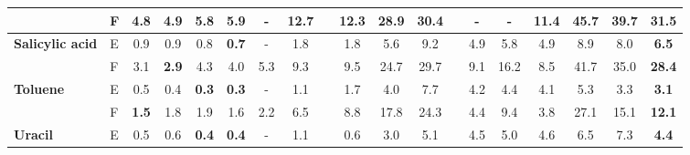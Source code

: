 \documentclass{article}
\begin{document}
\begin{table}
{\begin{tabular}{@{}llcccccccccccc | cc || ccc @{}}
       & F & \textbf{4.8}                                & 4.9                        & 5.8                                       & 5.9              & -   & 12.7                  &  & 12.3                      & 28.9                     & 30.4                     &  & -                            & -                      & 11.4                         & 45.7              & 39.7                 & \textbf{31.5} \\
      \midrule
      \multirow{2}{*}{\textbf{Salicylic acid}}
       & E & 0.9                                         & 0.9                        & 0.8                                       & \textbf{0.7}     & -    & 1.8                   &  & 1.8                       & 5.6                      & 9.2                      &  & 4.9                          & 5.8                    & 4.9                            & 8.9             & 8.0                  & \textbf{6.5}  \\
       & F & 3.1                                         & \textbf{2.9}               & 4.3                                       & 4.0                & 5.3  & 9.3                   &  & 9.5                       & 24.7                     & 29.7                     &  & 9.1                          & 16.2                   & 8.5                         &    41.7            & 35.0                 & \textbf{28.4} \\
      \midrule
      \multirow{2}{*}{\textbf{Toluene}}
       & E & 0.5                                         & 0.4                        & \textbf{0.3}                              & \textbf{0.3}     & -    & 1.1                   &  & 1.7                       & 4.0                      & 7.7                      &  & 4.2                          & 4.4                    & 4.1                           & 5.3              & 3.3                  & \textbf{3.1}  \\
       & F & \textbf{1.5}                                & 1.8                        & 1.9                                       & 1.6              & 2.2    & 6.5                   &  & 8.8                       & 17.8                     & 24.3                     &  & 4.4                          & 9.4                    & 3.8                       & 27.1                 & 15.1                 & \textbf{12.1} \\
      \midrule
      \multirow{2}{*}{\textbf{Uracil}}
       & E & 0.5                                         & 0.6                        & \textbf{0.4}                              & \textbf{0.4}    &   -  & 1.1                   &  & 0.6                       & 3.0                      & 5.1                      &  & 4.5                          & 5.0                    & 4.6                            & 6.5             & 7.3                 & \textbf{4.4}  \\

\end{tabular}}
\end{table}
\end{document}
